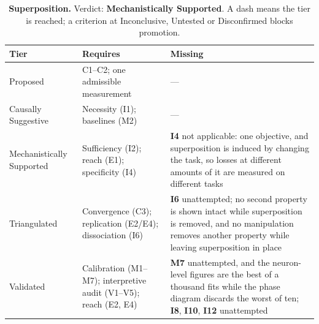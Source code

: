 \begin{table}[H]
\centering
\footnotesize
\caption{\textbf{Superposition.} Verdict: \textbf{Mechanistically Supported}. A dash means the tier is reached; a criterion at
Inconclusive, Untested or Disconfirmed blocks promotion.}
\label{tab:superposition-verdict}
\renewcommand{\arraystretch}{1.18}
\begin{tabular}{@{}l>{\raggedright\arraybackslash}p{3.6cm}>{\raggedright\arraybackslash}p{4.4cm}@{}}
\toprule
\textbf{Tier} & \textbf{Requires} & \textbf{Missing} \\
\midrule
Proposed & C1--C2; one admissible measurement & --- \\
\addlinespace[2pt]
Causally Suggestive & Necessity (I1); baselines (M2) & --- \\
\addlinespace[2pt]
Mechanistically Supported & Sufficiency (I2); reach (E1); specificity (I4) & \textbf{I4} not applicable: one objective, and superposition is induced by changing the task, so losses at different amounts of it are measured on different tasks \\
\addlinespace[2pt]
Triangulated & Convergence (C3); replication (E2/E4); dissociation (I6) & \textbf{I6} unattempted; no second property is shown intact while superposition is removed, and no manipulation removes another property while leaving superposition in place \\
\addlinespace[2pt]
Validated & Calibration (M1--M7); interpretive audit (V1--V5); reach (E2, E4) & \textbf{M7} unattempted, and the neuron-level figures are the best of a thousand fits while the phase diagram discards the worst of ten; \textbf{I8}, \textbf{I10}, \textbf{I12} unattempted \\
\bottomrule
\end{tabular}
\end{table}
